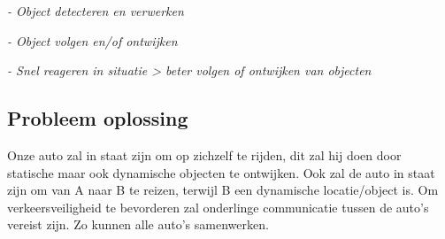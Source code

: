 \textit{- Object detecteren en verwerken}

\textit{- Object volgen en/of ontwijken}

\textit{- Snel reageren in situatie > beter volgen of ontwijken van objecten}

\subsection{Probleem oplossing}
Onze auto zal in staat zijn om op zichzelf te rijden, dit zal hij doen door\\ statische maar ook dynamische objecten te ontwijken. 
Ook zal de auto in staat zijn om van A naar B te reizen, terwijl B een dynamische locatie/object is.
Om verkeersveiligheid te bevorderen zal onderlinge communicatie tussen de auto's vereist zijn. Zo kunnen alle auto's samenwerken.